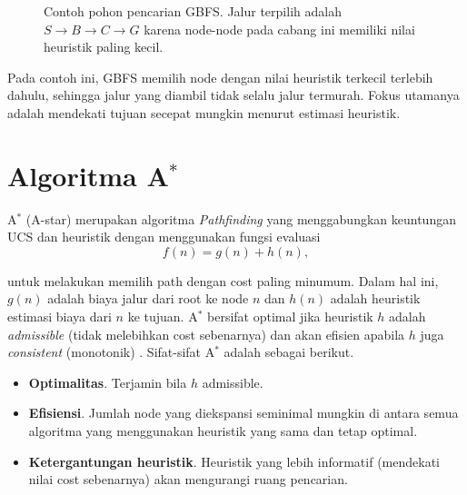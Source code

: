 \begin{figure}[H]
    \centering
    \caption{Contoh pohon pencarian GBFS. Jalur terpilih adalah $S \rightarrow B \rightarrow C \rightarrow G$ karena node-node pada cabang ini memiliki nilai heuristik paling kecil.}
    \label{fig:contoh-gbfs}
\end{figure}

Pada contoh ini, GBFS memilih node dengan nilai heuristik terkecil terlebih dahulu, sehingga jalur yang diambil tidak selalu jalur termurah. Fokus utamanya adalah mendekati tujuan secepat mungkin menurut estimasi heuristik.

\section{Algoritma A$^\ast$}

A$^\ast$ (A-star) merupakan algoritma \textit{Pathfinding} yang menggabungkan keuntungan UCS dan heuristik dengan menggunakan fungsi evaluasi
$$f(n) = g(n) + h(n),$$

untuk melakukan memilih path dengan cost paling minumum. Dalam hal ini, $g(n)$ adalah biaya jalur dari root ke node $n$ dan $h(n)$ adalah heuristik estimasi biaya dari $n$ ke tujuan. A$^\ast$ bersifat optimal jika heuristik $h$ adalah \emph{admissible} (tidak melebihkan cost sebenarnya) dan akan efisien apabila $h$ juga \emph{consistent} (monotonik) \cite{hart1968formal,russell2010artificial}. Sifat-sifat A$^\ast$ adalah sebagai berikut.
\begin{itemize}
    \item \textbf{Optimalitas}. Terjamin bila $h$ admissible.
    \item \textbf{Efisiensi}. Jumlah node yang diekspansi seminimal mungkin di antara semua algoritma yang menggunakan heuristik yang sama dan tetap optimal.
    \item \textbf{Ketergantungan heuristik}. Heuristik yang lebih informatif (mendekati nilai cost sebenarnya) akan mengurangi ruang pencarian.
\end{itemize}

